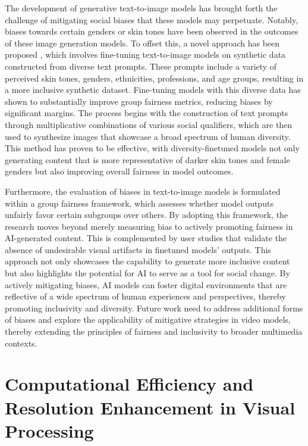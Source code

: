 \documentclass[11pt,a4paper,oneside]{report}
\begin{document}
The development of generative text-to-image models has brought forth the challenge of mitigating social biases that these models may perpetuate. 
Notably, biases towards certain genders or skin tones have been observed in the outcomes of these image generation models. 
To offset this, a novel approach has been proposed \cite{esposito2023mitigating}, which involves fine-tuning text-to-image models on synthetic data constructed from diverse text prompts. 
These prompts include a variety of perceived skin tones, genders, ethnicities, professions, and age groups, resulting in a more inclusive synthetic dataset. 
Fine-tuning models with this diverse data has shown to substantially improve group fairness metrics, reducing biases by significant margins.
The process begins with the construction of text prompts through multiplicative combinations of various social qualifiers, which are then used to synthesize images that showcase a broad spectrum of human diversity. 
This method has proven to be effective, with diversity-finetuned models not only generating content that is more representative of darker skin tones and female genders but also improving overall fairness in model outcomes.

Furthermore, the evaluation of biases in text-to-image models is formulated within a group fairness framework, which assesses whether model outputs unfairly favor certain subgroups over others. 
By adopting this framework, the research moves beyond merely measuring bias to actively promoting fairness in AI-generated content. 
This is complemented by user studies that validate the absence of undesirable visual artifacts in finetuned models' outputs.
This approach not only showcases the capability to generate more inclusive content but also highlights the potential for AI to serve as a tool for social change. 
By actively mitigating biases, AI models can foster digital environments that are reflective of a wide spectrum of human experiences and perspectives, thereby promoting inclusivity and diversity.
Future work need to address additional forms of biases and explore the applicability of mitigative strategies in video models, thereby extending the principles of fairness and inclusivity to broader multimedia contexts.

\section{Computational Efficiency and Resolution Enhancement in Visual Processing}
\end{document}

